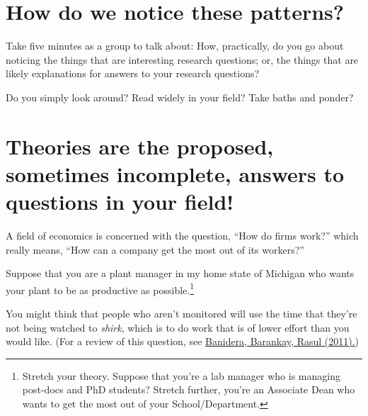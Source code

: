 \documentclass[
  letterpaper,
  DIV=11,
  numbers=noendperiod]{scrreprt}
\begin{document}
\section{How do we notice these
patterns?}\label{how-do-we-notice-these-patterns}

\begin{tcolorbox}[enhanced jigsaw, bottomtitle=1mm, coltitle=black, colback=white, colframe=quarto-callout-note-color-frame, title=\textcolor{quarto-callout-note-color}{\faInfo}\hspace{0.5em}{Breakout: Noticing Questions and Answers}, opacityback=0, arc=.35mm, titlerule=0mm, leftrule=.75mm, toptitle=1mm, rightrule=.15mm, opacitybacktitle=0.6, colbacktitle=quarto-callout-note-color!10!white, toprule=.15mm, left=2mm, bottomrule=.15mm, breakable]

Take five minutes as a group to talk about: How, practically, do you go
about noticing the things that are interesting research questions; or,
the things that are likely explanations for answers to your research
questions?

Do you simply look around? Read widely in your field? Take baths and
ponder?

\end{tcolorbox}

\section{Theories are the proposed, sometimes incomplete, answers to
questions in your
field!}\label{theories-are-the-proposed-sometimes-incomplete-answers-to-questions-in-your-field}

A field of economics is concerned with the question, ``How do firms
work?'' which really means, ``How can a company get the most out of its
workers?''

Suppose that you are a plant manager in my home state of Michigan who
wants your plant to be as productive as possible.\footnote{Stretch your
  theory. Suppose that you're a lab manager who is managing post-docs
  and PhD students? Stretch further, you're an Associate Dean who wants
  to get the most out of your School/Department.}

You might think that people who aren't monitored will use the time that
they're not being watched to \emph{shirk}, which is to do work that is
of lower effort than you would like. (For a review of this question, see
\href{./field_experiments_with_firms.pdf}{Banidera, Barankay, Rasul
(2011).})
\end{document}
